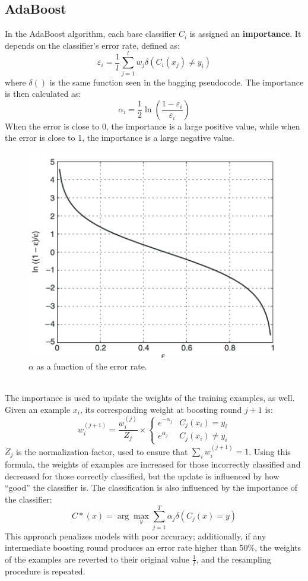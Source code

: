 \subsection{AdaBoost}

In the AdaBoost algorithm, each base classifier $C_i$ is assigned an \textbf{importance}. It depends on the classifier's error rate, defined as:
\begin{equation*}
    \varepsilon_i = \dfrac{1}{l} \sum_{j=1}^l w_j \delta(C_i(x_j) \neq y_i)
\end{equation*}
where $\delta()$ is the same function seen in the bagging pseudocode. The importance is then calculated as:
\begin{equation*}
    \alpha_i = \dfrac{1}{2} \ln \left(\dfrac{1-\varepsilon_i}{\varepsilon_i}\right)
\end{equation*}
When the error is close to 0, the importance is a large positive value, while when the error is close to 1, the importance is a large negative value.
\begin{figure}[h]
    \centering
    \includegraphics[width=0.4\linewidth]{img/importance_vs_errorrate.png}
    \caption{$\alpha$ as a function of the error rate.}
    \label{fig:importance-errorrate}
\end{figure} \\
The importance is used to update the weights of the training examples, as well. Given an example $x_i$, its corresponding weight at boosting round $j+1$ is:
\begin{equation*}
    w_i^{(j+1)} = \dfrac{w_i^{(j)}}{Z_j} \times \begin{cases}
        e^{-\alpha_j} & C_j(x_i) = y_i \\
        e^{\alpha_j} & C_j(x_i) \neq y_i 
    \end{cases}
\end{equation*}
$Z_j$ is the normalization factor, used to ensure that $\sum_i w_i^{(j+1)} = 1$. Using this formula, the weights of examples are increased for those incorrectly classified and decreased for those correctly classified, but the update is influenced by how ``good'' the classifier is. The classification is also influenced by the importance of the classifier:
\begin{equation*}
    C*(x) = \arg\max_y \sum_{j=1}^T \alpha_j \delta(C_j(x) = y)
\end{equation*}
This approach penalizes models with poor accuracy; additionally, if any intermediate boosting round produces an error rate higher than 50\%, the weights of the examples are reverted to their original value $\frac{1}{l}$, and the resampling procedure is repeated.

